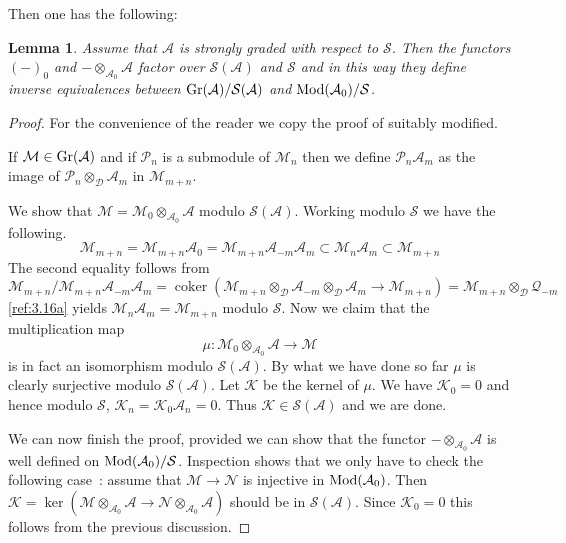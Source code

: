 \documentclass{amsproc}
\def\Ascr{{\mathcal A}}
\def\Dscr{{\mathcal D}}
\def\Kscr{{\mathcal K}}
\def\Mscr{{\mathcal M}}
\def\Nscr{{\mathcal N}}
\def\Pscr{{\mathcal P}}
\def\Qscr{{\mathcal Q}}
\def\Sscr{{\mathcal S}}
\def\Mod{\mathop{\text{Mod}}}
\def\Gr{\mathop{\text{Gr}}}
\def\coker{\operatorname {coker}}
\def\ker{\operatorname {ker}}
\def\r{\rightarrow}
\let\oldtext\text
\def\text#1{\oldtext{\upshape #1}}
\newtheorem{lemmas}{Lemma}[subsection]
\theoremstyle{definition}
\theoremstyle{remark}
\numberwithin{equation}{section}
\numberwithin{table}{section}
\numberwithin{figure}{section}
\def\Gr{\mathop{\text{Gr}}}
\begin{document}
Then one has the following:
\begin{lemmas} 
\label{ref:3.3.1a}
Assume that $\Ascr$ is strongly graded with respect to
$\Sscr$. Then
the functors $(-)_0$ and $-\otimes_{\Ascr_0}\Ascr$ factor over
$\Sscr(\Ascr)$ and $\Sscr$ and in this way they define inverse 
equivalences between $\Gr(\Ascr)/\Sscr(\Ascr)$ and $\Mod(\Ascr_0)/\Sscr$.
\end{lemmas}
\begin{proof} For the convenience of the reader we copy the proof of 
\cite[Thm. I.3.4]{NVO} suitably modified.

If $\Mscr\in\Gr(\Ascr)$ and if $\Pscr_n$ is a submodule of $\Mscr_n$ then
we define $\Pscr_n\Ascr_m$ as the image of $\Pscr_n\otimes_\Dscr\Ascr_m$ 
in $\Mscr_{m+n}$.

We  show that $\Mscr=\Mscr_0\otimes_{\Ascr_0}\Ascr$ 
modulo $\Sscr(\Ascr)$. Working modulo $\Sscr$ we have the following.
\begin{equation}
\label{ref:3.16a}
\Mscr_{m+n}=\Mscr_{m+n}\Ascr_0=\Mscr_{m+n}\Ascr_{-m}\Ascr_{m}\subset
\Mscr_n\Ascr_m\subset\Mscr_{m+n}
 \end{equation}
 The
second equality follows from
\[
\Mscr_{m+n}/\Mscr_{m+n}\Ascr_{-m}\Ascr_{m}=\coker
(\Mscr_{m+n}\otimes_\Dscr\Ascr_{-m}\otimes_\Dscr\Ascr_{m}\r
\Mscr_{m+n})=\Mscr_{m+n}\otimes_\Dscr\Qscr_{-m}
\]
\eqref{ref:3.16a} yields $\Mscr_n\Ascr_m=\Mscr_{m+n}$ modulo
$\Sscr$. Now we claim that  the multiplication map
\[
\mu:\Mscr_0\otimes_{\Ascr_0}\Ascr\r \Mscr
\]
is in fact an isomorphism modulo $\Sscr(\Ascr)$. By what we have done
so far $\mu$ is clearly surjective modulo $\Sscr(\Ascr)$. Let $\Kscr$ be
the kernel of $\mu$. We have $\Kscr_0=0$ and hence modulo $\Sscr$,
$\Kscr_n=\Kscr_0\Ascr_n=0$. Thus $\Kscr\in\Sscr(\Ascr)$ and we are done.

We can now finish the proof, provided we can show that the functor
$-\otimes_{\Ascr_0}\Ascr$ is well defined on
$\Mod(\Ascr_0)/\Sscr$. Inspection shows that we only have to check the
following case~: assume that $\Mscr\r \Nscr$ is injective in
$\Mod(\Ascr_0)$. Then $\Kscr=\ker (\Mscr\otimes_{\Ascr_0}\Ascr\r
\Nscr\otimes_{\Ascr_0}\Ascr)$ should be in $\Sscr(\Ascr)$. Since
$\Kscr_0=0$ this follows from the previous discussion.  
\end{proof}
\end{document}
